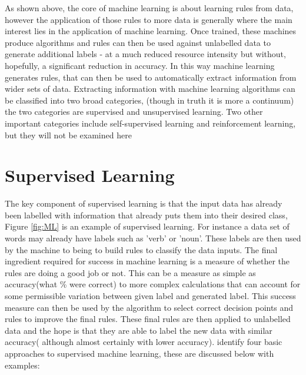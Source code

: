As shown above, the core of machine learning is about learning rules from data, however the application of those rules to more data is generally where the main interest lies in the application of machine learning. Once trained, these machines produce algorithms and rules can then be used against unlabelled data to generate additional labels - at a much reduced resource intensity but without, hopefully, a significant reduction in accuracy. In this way machine learning generates rules, that can then be used to automatically extract information from wider sets of data. Extracting information with machine learning algorithms can be classified into two broad categories, (though in truth it is more a continuum) the two categories are supervised and unsupervised  learning. Two other important categories include self-supervised learning and reinforcement learning, but they will not be examined here \parencite{chollet_allaire_2018}


\section{Supervised Learning} The key component of supervised learning is that the input data has already been labelled with information that already puts them into their desired class, Figure \ref{fig:ML} is an example of supervised learning. For instance a data set of words may already have labels such as 'verb' or 'noun'. These labels are then used by the machine to being to build rules to classify the data inputs. The final ingredient required for success in machine learning is a measure of whether the rules are doing a good job or not. This can be a measure as simple as accuracy(what \% were correct) to more complex calculations that can account for some permissible variation between given label and generated label. This success measure can then be used by the algorithm to select correct decision points and rules to improve the final rules. These final rules are then applied to unlabelled data and the hope is that they are able to label the new data with similar accuracy( although almost certainly with lower accuracy).  \textcite{chollet_allaire_2018} identify four basic approaches to supervised machine learning, these are discussed below with examples:

